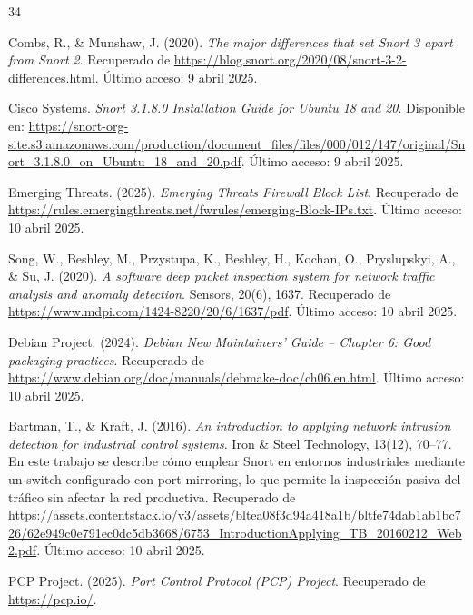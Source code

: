 \documentclass[11pt,a4paper,twoside]{report}
\begin{document}
\begin{thebibliography}{34}
	
	Combs, R., \& Munshaw, J. (2020). \textit{The major differences that set Snort 3 apart from Snort 2}. Recuperado de \url{https://blog.snort.org/2020/08/snort-3-2-differences.html}. Último acceso: 9 abril 2025.
	
	Cisco Systems. \textit{Snort 3.1.8.0 Installation Guide for Ubuntu 18 and 20}. Disponible en: \url{https://snort-org-site.s3.amazonaws.com/production/document_files/files/000/012/147/original/Snort_3.1.8.0_on_Ubuntu_18_and_20.pdf}. Último acceso: 9 abril 2025.
	
	 Emerging Threats. (2025). \textit{Emerging Threats Firewall Block List}. Recuperado de \url{https://rules.emergingthreats.net/fwrules/emerging-Block-IPs.txt}. Último acceso: 10 abril 2025.
	
	Song, W., Beshley, M., Przystupa, K., Beshley, H., Kochan, O., Pryslupskyi, A., \& Su, J. (2020). \textit{A software deep packet inspection system for network traffic analysis and anomaly detection}. Sensors, 20(6), 1637. Recuperado de \url{https://www.mdpi.com/1424-8220/20/6/1637/pdf}. Último acceso: 10 abril 2025.
	
	Debian Project. (2024). \textit{Debian New Maintainers’ Guide – Chapter 6: Good packaging practices}. Recuperado de \url{https://www.debian.org/doc/manuals/debmake-doc/ch06.en.html}. Último acceso: 10 abril 2025.
	
	Bartman, T., \& Kraft, J. (2016). \textit{An introduction to applying network intrusion detection for industrial control systems}. Iron \& Steel Technology, 13(12), 70--77. En este trabajo se describe cómo emplear Snort en entornos industriales mediante un switch configurado con port mirroring, lo que permite la inspección pasiva del tráfico sin afectar la red productiva. Recuperado de \url{https://assets.contentstack.io/v3/assets/bltea08f3d94a418a1b/bltfe74dab1ab1bc726/62e949c0e791ec0dc5db3668/6753_IntroductionApplying_TB_20160212_Web2.pdf}. Último acceso: 10 abril 2025.
	

 PCP Project. (2025). \textit{Port Control Protocol (PCP) Project}. Recuperado de \url{https://pcp.io/}.
	
\end{thebibliography}
\end{document}
